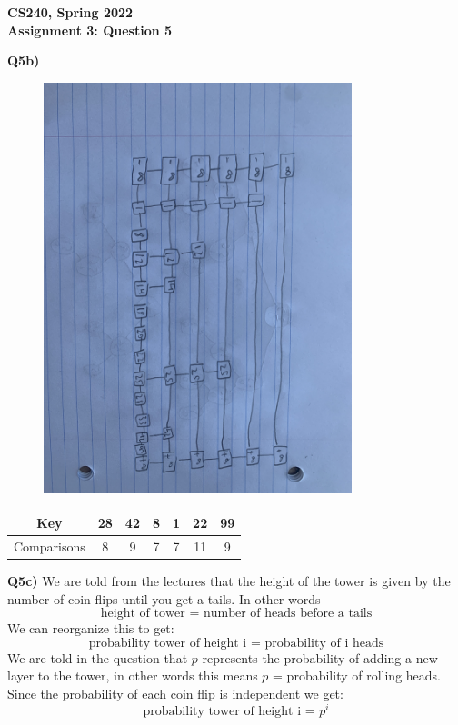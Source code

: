 \documentclass[12pt]{article}
\begin{document}
\begin{center}
{\Large\textbf{CS240, Spring 2022}}\\
\vspace{2mm}
{\Large\textbf{Assignment 3: Question 5}}\\
\vspace{3mm}
\end{center}
\begin{adjustwidth}{0em}{0pt}
\textbf{Q5b)} 
\begin{figure}[tbhp]
	\begin{center}
		\includegraphics[width=0.8\textwidth, angle=0]{1.jpg}
	\end{center}
\end{figure}

\begin{center}
\begin{tabular}{| c || c c c c c c|} 
 \hline
 Key & 28 & 42 & 8 & 1 & 22 & 99  \\
 \hline
 Comparisons & 8 & 9 & 7 & 7 & 11 & 9  \\ 
 \hline
\end{tabular}
\end{center}
\textbf{Q5c)} We are told from the lectures that the height of the tower is given by the number of coin flips until you get a tails. In other words
\[ \text{height of tower = } \text{number of heads before a tails} \] 
We can reorganize this to get:
\[ \text{probability tower of height i = } \text{probability of i heads} \] 
We are told in the question that $p$ represents the probability of adding a new layer to the tower, in other words this means $p$ = probability of rolling heads. Since the probability of each coin flip is independent we get:
\[ \text{probability tower of height i = } p^i \] 
\end{adjustwidth} 
\end{document}
